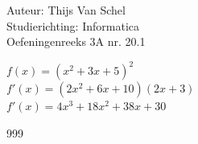 \documentclass[a4paper]{article}
\begin{document}
  
\noindent \large Auteur: Thijs Van Schel \\
\noindent \large Studierichting: Informatica\\
\noindent \large Oefeningenreeks 3A nr. 20.1\\

\medskip

\normalsize

$f(x) = (x^2+3x+5)^2$ \\

$f'(x) = (2x^2+6x+10)(2x+3)$ \\

$f'(x) = 4x^3 + 18x^2+38x+30$

\begin{thebibliography}{999}
\end{thebibliography}
\end{document}
